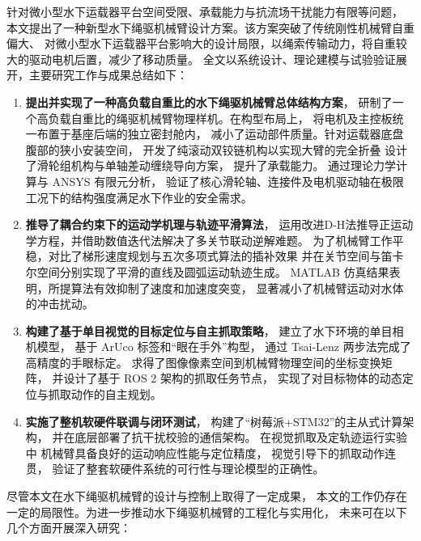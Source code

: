 




针对微小型水下运载器平台空间受限、承载能力与抗流场干扰能力有限等问题，
本文提出了一种新型水下绳驱机械臂设计方案。该方案突破了传统刚性机械臂自重偏大、
对微小型水下运载器平台影响大的设计局限，以绳索传输动力，将自重较大的驱动电机后置，减少了移动质量。
全文以系统设计、理论建模与试验验证展开，主要研究工作与成果总结如下：

\begin{enumerate}
    \item \textbf{提出并实现了一种高负载自重比的水下绳驱机械臂总体结构方案}，
    研制了一个高负载自重比的绳驱机械臂物理样机。在构型布局上，
    将电机及主控板统一布置于基座后端的独立密封舱内，
    减小了运动部件质量。针对运载器底盘腹部的狭小安装空间，
    开发了纯滚动双铰链机构以实现大臂的完全折叠
    设计了滑轮组机构与单轴差动缠绕导向方案，
    提升了承载能力。
    通过理论力学计算与 ANSYS 有限元分析，
    验证了核心滑轮轴、连接件及电机驱动轴在极限工况下的结构强度满足水下作业的安全需求。
    
    \item \textbf{推导了耦合约束下的运动学机理与轨迹平滑算法}，
    运用改进D-H法推导正运动学方程，并借助数值迭代法解决了多关节联动逆解难题。
    为了机械臂工作平稳，对比了梯形速度规划与五次多项式算法的插补效果
    并在关节空间与笛卡尔空间分别实现了平滑的直线及圆弧运动轨迹生成。
    MATLAB 仿真结果表明，所提算法有效抑制了速度和加速度突变，
    显著减小了机械臂运动对水体的冲击扰动。
    
    \item \textbf{构建了基于单目视觉的目标定位与自主抓取策略}，
    建立了水下环境的单目相机模型，
    基于 ArUco 标签和“眼在手外”构型，
    通过 Tsai-Lenz 两步法完成了高精度的手眼标定。
    求得了图像像素空间到机械臂物理空间的坐标变换矩阵，
    并设计了基于 ROS 2 架构的抓取任务节点，
    实现了对目标物体的动态定位与抓取动作的自主规划。
    
    \item \textbf{实施了整机软硬件联调与闭环测试}，
    构建了“树莓派+STM32”的主从式计算架构，
    并在底层部署了抗干扰校验的通信架构。
    在视觉抓取及定轨迹运行实验中
    机械臂具备良好的运动响应性能与定位精度，
    视觉引导下的抓取动作连贯，
    验证了整套软硬件系统的可行性与理论模型的正确性。
\end{enumerate}

尽管本文在水下绳驱机械臂的设计与控制上取得了一定成果，
本文的工作仍存在一定的局限性。为进一步推动水下绳驱机械臂的工程化与实用化，
未来可在以下几个方面开展深入研究：

